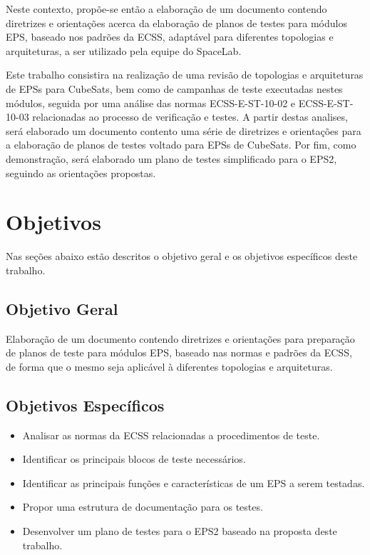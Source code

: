 Neste contexto, propõe-se então a elaboração de um documento contendo diretrizes e orientações acerca da elaboração de planos de testes para módulos \gls{EPS}, baseado nos padrões da \gls{ECSS}, adaptável para diferentes topologias e arquiteturas, a ser utilizado pela equipe do SpaceLab.

Este trabalho consistira na realização de uma revisão de topologias e arquiteturas de EPSs para CubeSats, bem como de campanhas de teste executadas nestes módulos, seguida por uma análise das normas ECSS-E-ST-10-02 \cite{ecss-e-st-10-02} e ECSS-E-ST-10-03 \cite{ecss-e-st-10-03} relacionadas ao processo de verificação e testes. A partir destas analises, será elaborado um documento contento uma série de diretrizes e orientações para a elaboração de planos de testes voltado para EPSs de CubeSats. Por fim, como demonstração, será elaborado um plano de testes simplificado para o \gls{EPS2}, seguindo as orientações propostas.

\section{Objetivos}\label{sec:objetivos}

Nas seções abaixo estão descritos o objetivo geral e os objetivos específicos deste trabalho.

\subsection{Objetivo Geral}


Elaboração de um documento contendo diretrizes e orientações para preparação de planos de teste para módulos \gls{EPS}, baseado nas normas e padrões da \gls{ECSS}, de forma que o mesmo seja aplicável à diferentes topologias e arquiteturas.

\subsection{Objetivos Específicos}

\begin{itemize}
    \item Analisar as normas da ECSS relacionadas a procedimentos de teste.
    \item Identificar os principais blocos de teste necessários.
    \item Identificar as principais funções e características de um \gls{EPS} a serem testadas.
    \item Propor uma estrutura de documentação para os testes.
    \item Desenvolver um plano de testes para o \gls{EPS2} baseado na proposta deste trabalho.
\end{itemize}